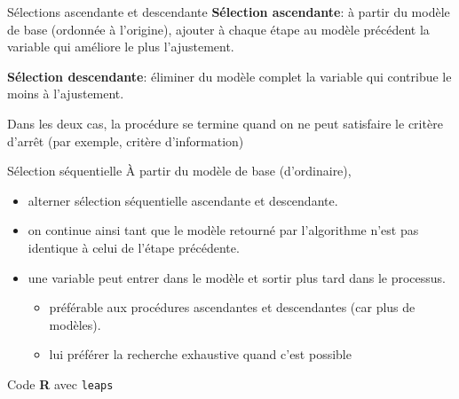 \documentclass[
  ignorenonframetext,
]{beamer}
\newenvironment{Shaded}{\begin{snugshade}}{\end{snugshade}}
\newcommand{\AttributeTok}[1]{\textcolor[rgb]{0.40,0.45,0.13}{#1}}
\newcommand{\CommentTok}[1]{\textcolor[rgb]{0.37,0.37,0.37}{#1}}
\newcommand{\FunctionTok}[1]{\textcolor[rgb]{0.28,0.35,0.67}{#1}}
\newcommand{\NormalTok}[1]{\textcolor[rgb]{0.00,0.23,0.31}{#1}}
\newcommand{\OtherTok}[1]{\textcolor[rgb]{0.00,0.23,0.31}{#1}}
\newcommand{\SpecialCharTok}[1]{\textcolor[rgb]{0.37,0.37,0.37}{#1}}
\newcommand{\StringTok}[1]{\textcolor[rgb]{0.13,0.47,0.30}{#1}}
\providecommand{\tightlist}{%
  \setlength{\itemsep}{0pt}\setlength{\parskip}{0pt}}\usepackage{longtable,booktabs,array}
\begin{document}
\begin{frame}{Sélections ascendante et descendante}
\protect\hypertarget{suxe9lections-ascendante-et-descendante}{}
\textbf{Sélection ascendante}: à partir du modèle de base (ordonnée à
l'origine), ajouter à chaque étape au modèle précédent la variable qui
améliore le plus l'ajustement.

\textbf{Sélection descendante}: éliminer du modèle complet la variable
qui contribue le moins à l'ajustement.

Dans les deux cas, la procédure se termine quand on ne peut satisfaire
le critère d'arrêt (par exemple, critère d'information)
\end{frame}

\begin{frame}{Sélection séquentielle}
\protect\hypertarget{suxe9lection-suxe9quentielle}{}
À partir du modèle de base (d'ordinaire),

\begin{itemize}
\tightlist
\item
  alterner sélection séquentielle ascendante et descendante.
\item
  on continue ainsi tant que le modèle retourné par l'algorithme n'est
  pas identique à celui de l'étape précédente.
\item
  une variable peut entrer dans le modèle et sortir plus tard dans le
  processus.

  \begin{itemize}
  \tightlist
  \item
    préférable aux procédures ascendantes et descendantes (car plus de
    modèles).
  \item
    lui préférer la recherche exhaustive quand c'est possible
  \end{itemize}
\end{itemize}
\end{frame}

\begin{frame}[fragile]{Code \textbf{R} avec \texttt{leaps}}
\protect\hypertarget{code-r-avec-leaps}{}
\begin{Shaded}
\end{Shaded}
\end{frame}
\end{document}
